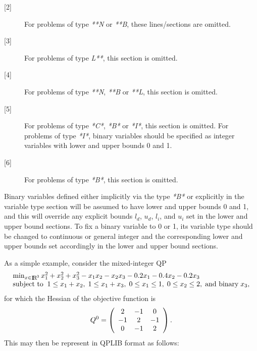 \begin{description}
\item [{[2]}]
For problems of type \textit{**N} or \textit{**B}, these lines/sections
are omitted.
\item [{[3]}]
For problems of type \textit{L**}, this section is omitted.
\item [{[4]}]
For problems of type \textit{**N}, \textit{**B} or \textit{**L},
this section is omitted.
\item [{[5]}]
For problems of type \textit{*C*}, \textit{*B*} or \textit{*I*},
this section is omitted. For problems of type \textit{*I*}, binary variables
should be specified as integer variables with lower and upper bounds 0 and 1.
\item [{[6]}]
For problems of type \textit{*B*}, this section is omitted.
\end{description}
Binary variables defined either implicitly via the type \textit{*B*}
or explicitly in the variable type section will be assumed to
have lower and upper bounds 0 and 1, and this will override any
explicit bounds $l_d$, $u_d$, $l_i$, and $u_i$ set in the lower and upper
bound sections.
To fix a binary variable to 0 or 1, its variable type should be changed
to continuous or general integer and the corresponding lower and upper
bounds set accordingly in the lower and upper bound sections.

As a simple example, consider the mixed-integer QP
\[\arr{l}{\min_{x \in \smallRe^3} x_1^2 + x_2^2 + x_3^2 - x_1 x_2 - x_2 x_3
  - 0.2 x_1  -0.4 x_2 - 0.2 x_3 \\
\st 1 \leq x_1 + x_2, \; 1 \leq x_1 + x_3, \; 0 \leq x_1 \leq 1,
\; 0 \leq x_2 \leq 2, \; \mbox{and binary} \; x_3,}
\]
for which the Hessian of the objective function is
\[Q^0 = \mat{ccc}{2 & -1 & 0 \\ -1 & 2 & -1 \\ 0 & -1 & 2}.\]
This may then be represent in QPLIB format as follows:

